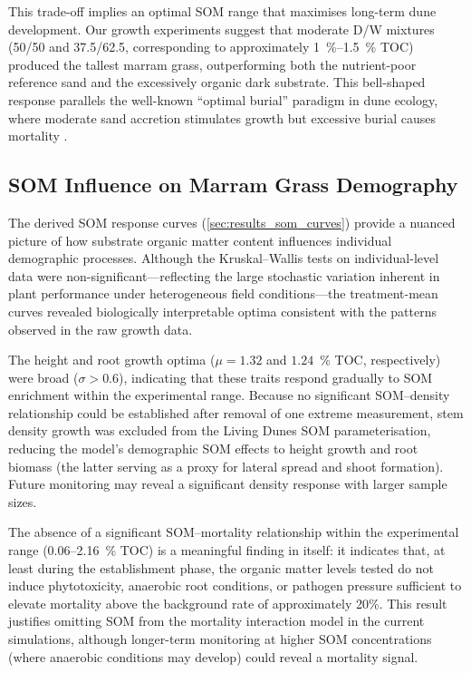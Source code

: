 \documentclass[authoryear,preprint,review,12pt]{elsarticle}
\begin{document}
This trade-off implies an optimal SOM range that maximises long-term dune development. Our growth experiments suggest that moderate D/W mixtures (50/50 and 37.5/62.5, corresponding to approximately \SIrange{1}{1.5}{\percent} TOC) produced the tallest marram grass, outperforming both the nutrient-poor reference sand and the excessively organic dark substrate. This bell-shaped response parallels the well-known ``optimal burial'' paradigm in dune ecology, where moderate sand accretion stimulates growth but excessive burial causes mortality \citep{maun1998adaptations}.

\subsection{SOM Influence on Marram Grass Demography}

The derived SOM response curves (\cref{sec:results_som_curves}) provide a nuanced picture of how substrate organic matter content influences individual demographic processes. Although the Kruskal--Wallis tests on individual-level data were non-significant---reflecting the large stochastic variation inherent in plant performance under heterogeneous field conditions---the treatment-mean curves revealed biologically interpretable optima consistent with the patterns observed in the raw growth data.

The height and root growth optima ($\mu = 1.32$ and $1.24$~\% TOC, respectively) were broad ($\sigma > 0.6$), indicating that these traits respond gradually to SOM enrichment within the experimental range. Because no significant SOM--density relationship could be established after removal of one extreme measurement, stem density growth was excluded from the Living Dunes SOM parameterisation, reducing the model's demographic SOM effects to height growth and root biomass (the latter serving as a proxy for lateral spread and shoot formation). Future monitoring may reveal a significant density response with larger sample sizes.

The absence of a significant SOM--mortality relationship within the experimental range (0.06--2.16~\% TOC) is a meaningful finding in itself: it indicates that, at least during the establishment phase, the organic matter levels tested do not induce phytotoxicity, anaerobic root conditions, or pathogen pressure sufficient to elevate mortality above the background rate of approximately 20\%. This result justifies omitting SOM from the mortality interaction model in the current simulations, although longer-term monitoring at higher SOM concentrations (where anaerobic conditions may develop) could reveal a mortality signal.
\end{document}
